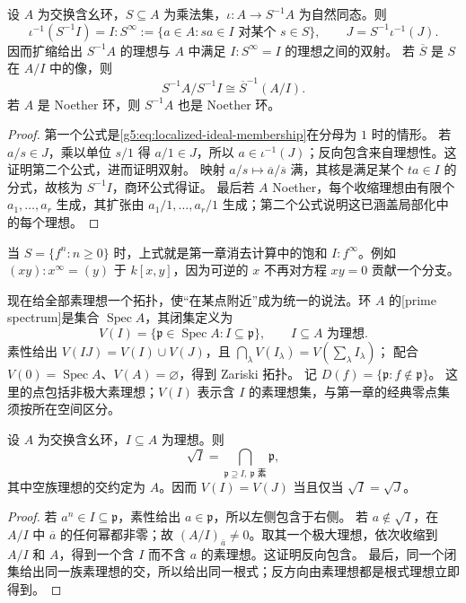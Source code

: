 \begin{proposition}\label{g5:prop:localization-ideals}
	设 \(A\) 为交换含幺环，\(S\subseteq A\) 为乘法集，\(\iota:A\to S^{-1}A\) 为自然同态。则
	\[
	\iota^{-1}(S^{-1}I)=
	I:S^\infty:=\{a\in A:sa\in I\text{ 对某个 }s\in S\},
	\qquad
	J=S^{-1}\iota^{-1}(J).
	\]
	因而扩缩给出 \(S^{-1}A\) 的理想与 \(A\) 中满足 \(I:S^\infty=I\) 的理想之间的双射。 若 \(\overline S\) 是 \(S\) 在 \(A/I\) 中的像，则
	\[
	S^{-1}A/S^{-1}I\cong\overline S^{-1}(A/I).
	\]
	若 \(A\) 是 Noether 环，则 \(S^{-1}A\) 也是 Noether 环。
\end{proposition}
\begin{proof}
	第一个公式是\eqref{g5:eq:localized-ideal-membership}在分母为 \(1\) 时的情形。 若 \(a/s\in J\)，乘以单位 \(s/1\) 得 \(a/1\in J\)，所以 \(a\in\iota^{-1}(J)\)；反向包含来自理想性。这证明第二个公式，进而证明双射。 映射 \(a/s\mapsto\overline a/\overline s\) 满，其核是满足某个 \(ta\in I\) 的分式，故核为 \(S^{-1}I\)，商环公式得证。 最后若 \(A\) Noether，每个收缩理想由有限个 \(a_1,\ldots,a_r\) 生成，其扩张由 \(a_1/1,\ldots,a_r/1\) 生成；第二个公式说明这已涵盖局部化中的每个理想。
\end{proof}

当 \(S=\{f^n:n\geq0\}\) 时，上式就是第一章消去计算中的饱和 \(I:f^\infty\)。例如 \((xy):x^\infty=(y)\) 于 \(k[x,y]\)，因为可逆的 \(x\) 不再对方程 \(xy=0\) 贡献一个分支。

\ProseParagraphBreak

现在给全部素理想一个拓扑，使“在某点附近”成为统一的说法。环 \(A\) 的[prime spectrum]是集合 \(\operatorname{Spec}A\)，其闭集定义为
\[
	V(I)=\{\mathfrak p\in\operatorname{Spec}A:I\subseteq\mathfrak p\},
	\qquad I\subseteq A\text{ 为理想}.
\]
素性给出 \(V(IJ)=V(I)\cup V(J)\)，且 \(\bigcap_\lambda V(I_\lambda)=V(\sum_\lambda I_\lambda)\)； 配合 \(V(0)=\operatorname{Spec}A\)、\(V(A)=\varnothing\)，得到 Zariski 拓扑。 记 \(D(f)=\{\mathfrak p:f\notin\mathfrak p\}\)。 这里的点包括非极大素理想；\(V(I)\) 表示含 \(I\) 的素理想集，与第一章的经典零点集须按所在空间区分。

\begin{proposition}\label{g5:prop:radical-prime-intersection}
	设 \(A\) 为交换含幺环，\(I\subseteq A\) 为理想。则
	\[
	\sqrt I=\bigcap_{\mathfrak p\supseteq I,\ \mathfrak p\text{ 素}}\mathfrak p,
	\]
	其中空族理想的交约定为 \(A\)。因而 \(V(I)=V(J)\) 当且仅当 \(\sqrt I=\sqrt J\)。
\end{proposition}
\begin{proof}
	若 \(a^n\in I\subseteq\mathfrak p\)，素性给出 \(a\in\mathfrak p\)，所以左侧包含于右侧。 若 \(a\notin\sqrt I\)，在 \(A/I\) 中 \(\overline a\) 的任何幂都非零；故 \((A/I)_{\overline a}\ne0\)。取其一个极大理想，依次收缩到 \(A/I\) 和 \(A\)，得到一个含 \(I\) 而不含 \(a\) 的素理想。这证明反向包含。 最后，同一个闭集给出同一族素理想的交，所以给出同一根式；反方向由素理想都是根式理想立即得到。
\end{proof}

